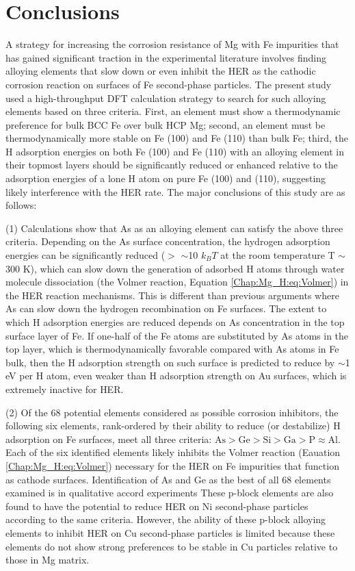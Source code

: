 \section{Conclusions}

A strategy for increasing the corrosion resistance of Mg with Fe impurities that has gained significant traction in the experimental literature involves finding alloying elements that slow down or even inhibit the \ac{HER} as the cathodic corrosion reaction on surfaces of Fe second-phase particles. The present study used a high-throughput DFT calculation strategy to search for such alloying elements based on three criteria. First, an element must show a thermodynamic preference for bulk BCC Fe over bulk HCP Mg; second, an element must be thermodynamically more stable on Fe (100) and Fe (110) than bulk Fe; third, the H adsorption energies on both Fe (100) and Fe (110) with an alloying element in their topmost layers should be significantly reduced or enhanced relative to the adsorption energies of a lone H atom on pure Fe (100) and (110), suggesting likely interference with the \ac{HER} rate. The major conclusions of this study are as follows:

(1) Calculations show that As as an alloying element can satisfy the above three criteria. Depending on the As surface concentration, the hydrogen adsorption energies can be significantly reduced ($>$ $\sim$10 $k_{B}T$ at the room temperature T $\sim$ 300 K), which can slow down the generation of adsorbed H atoms through water molecule dissociation (the Volmer reaction, Equation \ref{Chap:Mg_H:eq:Volmer}) in the \ac{HER} reaction mechanisms. This is different than previous arguments where As can slow down the hydrogen recombination on Fe surfaces. The extent to which H adsorption energies are reduced depends on As concentration in the top surface layer of Fe. If one-half of the Fe atoms are substituted by As atoms in the top layer, which is thermodynamically favorable compared with As atoms in Fe bulk, then the H adsorption strength on such surface is predicted to reduce by $\sim$1 eV per H atom, even weaker than H adsorption strength on Au surfaces, which is extremely inactive for \ac{HER}.

(2) Of the 68 potential elements considered as possible corrosion inhibitors, the following six elements, rank-ordered by their ability to reduce (or destabilize) H adsorption on Fe surfaces, meet all three criteria: $\text{As} > \text{Ge} > \text{Si} > \text{Ga} > \text{P} \approx \text{Al}$. Each of the six identified elements likely inhibits the Volmer reaction (Eauation \ref{Chap:Mg_H:eq:Volmer}) necessary for the \ac{HER} on Fe impurities that function as cathode surfaces. Identification of As and Ge as the best of all 68 elements examined is in qualitative accord experiments These p-block elements are also found to have the potential to reduce \ac{HER} on Ni second-phase particles according to the same criteria. However, the ability of these p-block alloying elements to inhibit \ac{HER} on Cu second-phase particles is limited because these elements do not show strong preferences to be stable in Cu particles relative to those in Mg matrix.

